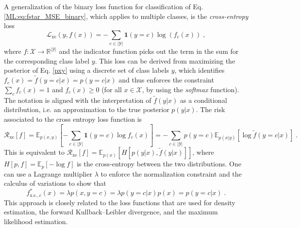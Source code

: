 A generalization of the binary loss function for classification of Eq. \ref{ML:eq:fstar_MSE_binary}, which applies to multiple classes, is the \textit{cross-entropy} loss
\begin{equation}
    \label{ML:eq:cross-entropy}
    \mathcal{L}_\textrm{xe}(y, f(x))= - \sum_{c\in |\mathcal{Y}|} \mathbf{1}(y=c) \log(f_c(x)) \; ,
\end{equation}
where $f:\mathcal{X} \to \mathbb{R}^{|\mathcal{Y}|}$ and the indicator function picks out the term in the sum for the corresponding class label $y$. This loss can be derived from maximizing the posterior of Eq. 
\ref{pxy} using a discrete set of class labels $y$, which identifies $f_c(x)=\tilde{f}(y=c|x)=p(y=c|x)$ and thus enforces the constraint $\sum_c f_c(x)=1$ and $f_c(x)\ge 0$ (for all $x\in \mathcal{X}$, \eg by using the \textit{softmax} function). 
The notation is aligned with the interpretation of $\tilde{f}(y|x)$ as a conditional distribution, i.e. an approximation to the true posterior $p(y|x)$.
The risk associated to the cross entropy loss function is 
\begin{equation}
    \label{ML:eq:xe_risk}
    \mathcal{R}_\textrm{xe}[f] = \mathbb{E}_{p(x,y)}\left[ -\sum_{c\in |\mathcal{Y}|} \mathbf{1}(y=c) \log f_c(x) \right] = - \sum_{c\in |\mathcal{Y}|} p(y=c) \mathbb{E}_{p(x|y)}[ \log \tilde{f}(y=c|x)] %
    \;.
\end{equation}
This is equivalent to $\mathcal{R}_\textrm{xe}[f] = \mathbb{E}_{p(x)}[H[p(y|x), \tilde{f}(y|x)]]$, where $H[p,f]=\mathbb{E}_p[-\log f]$ is the cross-entropy between the two distributions. 
One can use a Lagrange multiplier $\lambda$ to enforce the normalization constraint and the calculus of variations to show that
\begin{equation}
    \label{ML:eq:fstar_xe}
    f^*_{\textrm{x.e.},c}(x) = \lambda p(x,y=c) = \lambda p(y=c|x) p(x) = p(y=c|x)\;.
\end{equation}
This approach is closely related to the loss functions that are used for density estimation, the forward Kullback–Leibler divergence, and the maximum likelihood estimation. 

